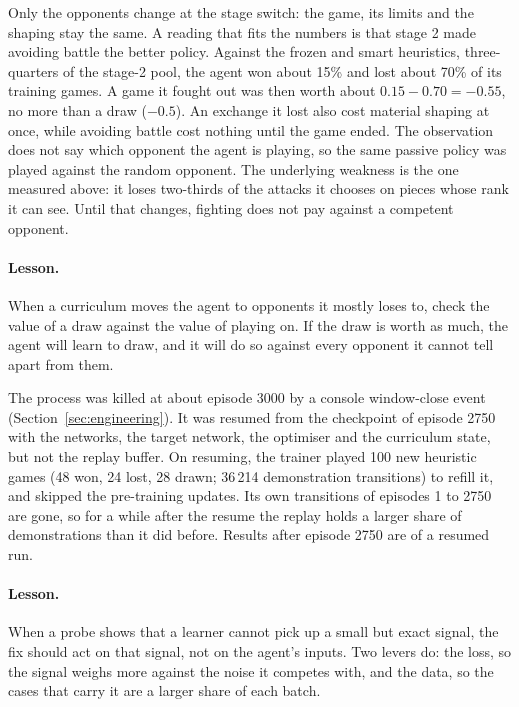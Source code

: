 Only the opponents change at the stage switch: the game, its limits and the shaping stay the
same. A reading that fits the numbers is that stage 2 made avoiding battle the better policy. Against
the frozen and smart heuristics, three-quarters of the stage-2 pool, the agent won about 15\% and
lost about 70\% of its training games. A game it fought out was then worth about
$0.15 - 0.70 = -0.55$, no more than a draw ($-0.5$). An exchange it lost also cost material
shaping at once, while avoiding battle cost nothing until the game ended. The observation does
not say which opponent the agent is playing, so the same passive policy was played against the
random opponent. The underlying weakness is the one measured above: it loses two-thirds of the
attacks it chooses on pieces whose rank it can see. Until that changes, fighting does not pay
against a competent opponent.

\paragraph{Lesson.} When a curriculum moves the agent to opponents it mostly loses to, check the
value of a draw against the value of playing on. If the draw is worth as much, the agent will learn
to draw, and it will do so against every opponent it cannot tell apart from them.

The process was killed at about episode 3000 by a console window-close event
(Section~\ref{sec:engineering}). It was resumed from the checkpoint of episode 2750 with the
networks, the target network, the optimiser and the curriculum state, but not the replay
buffer. On resuming, the trainer played 100 new heuristic games (48 won, 24 lost, 28 drawn;
36\,214 demonstration transitions) to refill it, and skipped the pre-training updates. Its own
transitions of episodes 1 to 2750 are gone, so for a while after the resume the replay holds a
larger share of demonstrations than it did before. Results after episode 2750 are of a resumed
run.

\paragraph{Lesson.} When a probe shows that a learner cannot pick up a small but exact signal, the
fix should act on that signal, not on the agent's inputs. Two levers do: the loss, so the signal
weighs more against the noise it competes with, and the data, so the cases that carry it are a
larger share of each batch.

